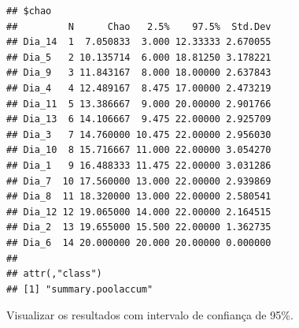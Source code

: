 \documentclass[
]{book}
\begin{document}
\begin{verbatim}
## $chao
##         N      Chao   2.5%    97.5%  Std.Dev
## Dia_14  1  7.050833  3.000 12.33333 2.670055
## Dia_5   2 10.135714  6.000 18.81250 3.178221
## Dia_9   3 11.843167  8.000 18.00000 2.637843
## Dia_4   4 12.489167  8.475 17.00000 2.473219
## Dia_11  5 13.386667  9.000 20.00000 2.901766
## Dia_13  6 14.106667  9.475 22.00000 2.925709
## Dia_3   7 14.760000 10.475 22.00000 2.956030
## Dia_10  8 15.716667 11.000 22.00000 3.054270
## Dia_1   9 16.488333 11.475 22.00000 3.031286
## Dia_7  10 17.560000 13.000 22.00000 2.939869
## Dia_8  11 18.320000 13.000 22.00000 2.580541
## Dia_12 12 19.065000 14.000 22.00000 2.164515
## Dia_2  13 19.655000 15.500 22.00000 1.362735
## Dia_6  14 20.000000 20.000 20.00000 0.000000
## 
## attr(,"class")
## [1] "summary.poolaccum"
\end{verbatim}

Visualizar os resultados com intervalo de confiança de 95\%.
\end{document}
